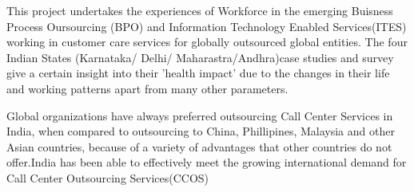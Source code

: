 This project undertakes the experiences of Workforce in the emerging Buisness Process Oursourcing (BPO) and Information Technology Enabled Services(ITES) working in customer care services for globally outsourced global entities. The four Indian States (Karnataka/ Delhi/ Maharastra/Andhra)case studies and survey give a certain insight into their 'health impact' due to the changes in their life and working patterns apart from many other parameters.

Global organizations have always preferred outsourcing Call Center Services in India, when compared to outsourcing to China, Phillipines, Malaysia and other Asian countries, because of a variety of advantages that other countries do not offer.India has been able to effectively meet the growing international demand for Call Center Outsourcing Services(CCOS)  